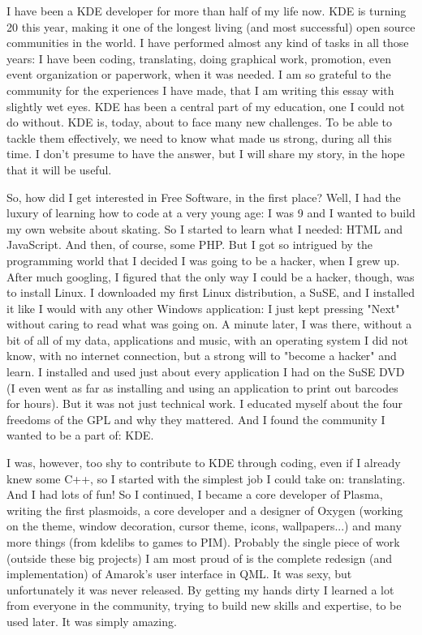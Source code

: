 

\noindent{}I have been a KDE developer for more than half of my life now. KDE is turning 20 this year, making it one of the longest living (and most successful) open source communities in the world. I have performed almost any kind of tasks in all those years: I have been coding, translating, doing graphical work, promotion, even event organization or paperwork, when it was needed. I am so grateful to the community for the experiences I have made, that I am writing this essay with slightly wet eyes. KDE has been a central part of my education, one I could not do without. KDE is, today, about to face many new challenges. To be able to tackle them effectively, we need to know what made us strong, during all this time. I don't presume to have the answer, but I will share my story, in the hope that it will be useful.

So, how did I get interested in Free Software, in the first place? Well, I had the luxury of learning how to code at a very young age: I was 9 and I wanted to build my own website about skating. So I started to learn what I needed: HTML and JavaScript. And then, of course, some PHP. But I got so intrigued by the programming world that I decided I was going to be a hacker, when I grew up. After much googling, I figured that the only way I could be a hacker, though, was to install Linux. I downloaded my first Linux distribution, a SuSE, and I installed it like I would with any other Windows application: I just kept pressing "Next" without caring to read what was going on. A minute later, I was there, without a bit of all of my data, applications and music, with an operating system I did not know, with no internet connection, but a strong will to "become a hacker" and learn. I installed and used just about every application I had on the SuSE DVD (I even went as far as installing and using an application to print out barcodes for hours). But it was not just technical work. I educated myself about the four freedoms of the GPL and why they mattered. And I found the community I wanted to be a part of: KDE.

I was, however, too shy to contribute to KDE through coding, even if I already knew some C++, so I started with the simplest job I could take on: translating. And I had lots of fun! So I continued, I became a core developer of Plasma, writing the first plasmoids, a core developer and a designer of Oxygen (working on the theme, window decoration, cursor theme, icons, wallpapers...) and many more things (from kdelibs to games to PIM). Probably the single piece of work (outside these big projects) I am most proud of is the complete redesign (and implementation) of Amarok's user interface in QML. It was sexy, but unfortunately it was never released.
By getting my hands dirty I learned a lot from everyone in the community, trying to build new skills and expertise, to be used later. It was simply amazing.


